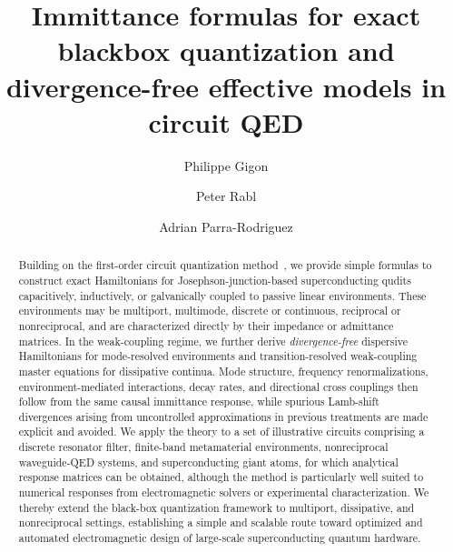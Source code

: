 \documentclass[prx,aps,twocolumn,article]{revtex4-2}
\begin{document}
  
\title{Immittance formulas for exact blackbox quantization and \\ divergence-free effective models in circuit QED}

\author{Philippe Gigon}
\author{Peter Rabl}
\author{Adrian Parra-Rodriguez}


\begin{abstract}
Building on the first-order circuit quantization method~\cite{ParraRodriguez:2024,ParraRodriguez:2025}, we provide simple formulas to construct exact Hamiltonians for Josephson-junction-based superconducting qudits capacitively, inductively, or galvanically coupled to passive linear environments. These environments may be multiport, multimode, discrete or continuous, reciprocal or nonreciprocal, and are characterized directly by their impedance or admittance matrices. In the weak-coupling regime, we further derive \emph{divergence-free} dispersive Hamiltonians for mode-resolved environments and transition-resolved weak-coupling master equations for dissipative continua. Mode structure, frequency renormalizations, environment-mediated interactions, decay rates, and directional cross couplings then follow from the same causal immittance response, while spurious Lamb-shift divergences arising from uncontrolled approximations in previous treatments are made explicit and avoided. We apply the theory to a set of illustrative circuits comprising a discrete resonator filter, finite-band metamaterial environments, nonreciprocal waveguide-QED systems, and superconducting giant atoms, for which analytical response matrices can be obtained, although the method is particularly well suited to numerical responses from electromagnetic solvers or experimental characterization. We thereby extend the black-box quantization framework to multiport, dissipative, and nonreciprocal settings, establishing a simple and scalable route toward optimized and automated electromagnetic design of large-scale superconducting quantum hardware.
\end{abstract}

\maketitle
\end{document}
